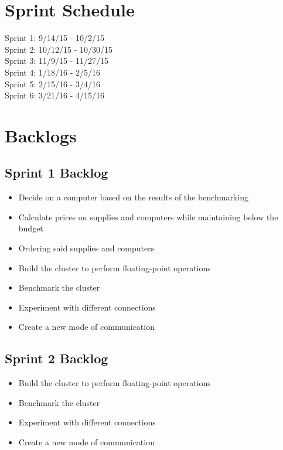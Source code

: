 \section{Sprint Schedule}

Sprint 1: 9/14/15 - 10/2/15 \\
Sprint 2: 10/12/15 - 10/30/15 \\
Sprint 3: 11/9/15 - 11/27/15 \\
Sprint 4: 1/18/16 - 2/5/16 \\
Sprint 5: 2/15/16 - 3/4/16 \\
Sprint 6: 3/21/16 - 4/15/16 \\



\section{Backlogs}

\subsection*{Sprint 1 Backlog}
\begin{itemize}
	\item Decide on a computer based on the results of the benchmarking
	\item Calculate prices on supplies and computers while maintaining below the budget
	\item Ordering said supplies and computers
	\item Build the cluster to perform floating-point operations
	\item Benchmark the cluster
	\item Experiment with different connections
	\item Create a new mode of communication
\end{itemize}

\subsection*{Sprint 2 Backlog}
\begin{itemize}
	\item Build the cluster to perform floating-point operations
	\item Benchmark the cluster
	\item Experiment with different connections
	\item Create a new mode of communication
\end{itemize}

